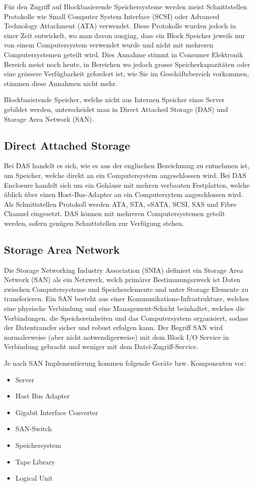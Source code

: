 Für den Zugriff auf Blockbasierende Speichersysteme werden meist Schnittstellen Protokolle wie Small Computer System Interface (SCSI) oder Advanced Technology Attachment (ATA) verwendet. Diese Protokolle wurden jedoch in einer Zeit entwickelt, wo man davon ausging, dass ein Block Speicher jeweils nur von einem Computersystem verwendet wurde und nicht mit mehreren Computersystemen geteilt wird. Dies Annahme stimmt in Consumer Elektronik Bereich meist noch heute, in Bereichen wo jedoch grosse Speicherkapazitäten oder eine grössere Verfügbarkeit gefordert ist, wie Sie im Geschäftsbereich vorkommen, stimmen diese Annahmen nicht mehr.

Blockbasierende Speicher, welche nicht aus Internen Speicher eines Server gebildet werden, unterscheidet man in Direct Attached Storage (DAS) und Storage Area Network (SAN). 

\subsection{Direct Attached Storage}
Bei DAS handelt es sich, wie es aus der englischen Bezeichnung zu entnehmen ist, um Speicher, welche direkt an ein Computersystem angeschlossen wird. Bei DAS Enclosure handelt sich um ein Gehäuse mit mehren verbauten Festplatten, welche üblich über einen Host-Bus-Adapter an ein Computersytem angeschlossen wird. Als Schnittstellen Protokoll werden ATA, STA, eSATA, SCSI, SAS und Fibre Channel eingesetzt. DAS können mit mehreren Computersystemen geteilt werden, sofern genügen Schnittstellen zur Verfügung stehen.

\subsection{Storage Area Network}
Die Storage Networking Industry Association (SNIA) definiert ein Storage Area Network (SAN) als ein Netzwerk, welch primärer Bestimmungszweck ist Daten zwischen Computersysteme und Speicherelemente und unter Storage Elemente zu transferieren. Ein SAN besteht aus einer Kommunikations-Infrastrukture, welches eine physische Verbindung und eine Management-Schicht beinhaltet, welches die Verbindungen, die Speichereinheiten und das Computersystem organisiert, sodass der Datentransfer sicher und robust erfolgen kann. Der Begriff SAN wird normalerweise (aber nicht notwendigerweise) mit dem Block I/O Service in Verbindung gebracht und weniger mit dem Datei-Zugriff-Service.\cite{SNIA2011}

Je nach SAN Implementierung kommen folgende Geräte bzw. Komponenten vor:
\begin{itemize}
\item Server
\item Host Bus Adapter
\item Gigabit Interface Converter
\item SAN-Switch
\item Speichersystem
\item Tape Library
\item Logical Unit
\end{itemize}

